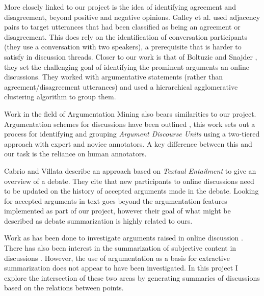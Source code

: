     More closely linked to our project is the idea of identifying agreement and disagreement, beyond positive and negative opinions. Galley et al. \cite{galley2004identifying} used adjacency pairs to target utterances that had been classified as being an agreement or disagreement. This does rely on the identification of conversation participants (they use a conversation with two speakers), a prerequisite that is harder to satisfy in discussion threads. Closer to our work is that of Boltuzic and Snajder \cite{boltuzic2015identifying}, they set the challenging goal of identifying the prominent arguments an online discussions. They worked with argumentative statements (rather than agreement/disagreement utterances) and used a hierarchical agglomerative clustering algorithm to group them.

    Work in the field of Argumentation Mining also bears similarities to our project. Argumentation schemes for discussions have been outlined \cite{ghosh2014analyzing}, this work sets out a process for identifying and grouping \textit{Argument Discourse Units} using a two-tiered approach with expert and novice annotators. A key difference between this and our task is the reliance on human annotators.

    Cabrio and Villata \cite{cabrio2012combining} describe an approach based on \textit{Textual Entailment} to give an overview of a debate. They cite that new participants to online discussions need to be updated on the history of accepted arguments made in the debate. Looking for accepted arguments in text goes beyond the argumentation features implemented as part of our project, however their goal of what might be described as debate summarization is highly related to ours.

    Work as has been done to investigate arguments raised in online discussion \cite{boltuzic2015identifying,cabrio2012combining,ghosh2014analyzing}. There has also been interest in the summarization of subjective content in discussions \cite{hu2004mining,lloret2009towards,galley2004identifying}. However, the use of argumentation as a basis for extractive summarization does not appear to have been investigated. In this project I explore the intersection of these two areas by generating summaries of discussions based on the relations between points.
